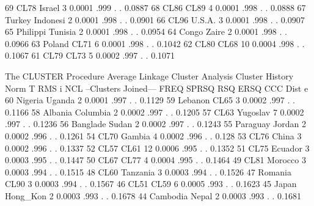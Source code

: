 \documentclass{article}
\begin{document}
\begin{Woutput}
    69    CL78        Israel           3    0.0001    .999    .        .      0.0887
    68    CL86        CL89             4    0.0001    .998    .        .      0.0888
    67    Turkey      Indonesi         2    0.0001    .998    .        .      0.0901
    66    CL96        U.S.A.           3    0.0001    .998    .        .      0.0907
    65    Philippi    Tunisia          2    0.0001    .998    .        .      0.0954
    64    Congo       Zaire            2    0.0001    .998    .        .      0.0966
    63    Poland      CL71             6    0.0001    .998    .        .      0.1042
    62    CL80        CL68            10    0.0004    .998    .        .      0.1067
    61    CL79        CL73             5    0.0002    .997    .        .      0.1071

The CLUSTER Procedure
Average Linkage Cluster Analysis
                                     Cluster History
                                                                                Norm    T
                                                                                 RMS    i
   NCL    --Clusters Joined---      FREQ     SPRSQ     RSQ    ERSQ     CCC      Dist    e
    60    Nigeria     Uganda           2    0.0001    .997    .        .      0.1129
    59    Lebanon     CL65             3    0.0002    .997    .        .      0.1166
    58    Albania     Columbia         2    0.0002    .997    .        .      0.1205
    57    CL63        Yugoslav         7    0.0002    .997    .        .      0.1236
    56    Banglade    Sudan            2    0.0002    .997    .        .      0.1243
    55    Paraguay    Jordan           2    0.0002    .996    .        .      0.1261
    54    CL70        Gambia           4    0.0002    .996    .        .       0.128
    53    CL76        China            3    0.0002    .996    .        .      0.1337
    52    CL57        CL61            12    0.0006    .995    .        .      0.1352
    51    CL75        Ecuador          3    0.0003    .995    .        .      0.1447
    50    CL67        CL77             4    0.0004    .995    .        .      0.1464
    49    CL81        Morocco          3    0.0003    .994    .        .      0.1515
    48    CL60        Tanzania         3    0.0003    .994    .        .      0.1526
    47    Romania     CL90             3    0.0003    .994    .        .      0.1567
    46    CL51        CL59             6    0.0005    .993    .        .      0.1623
    45    Japan       Hong_Kon         2    0.0003    .993    .        .      0.1678
    44    Cambodia    Nepal            2    0.0003    .993    .        .      0.1681

\end{Woutput}
\end{document}
